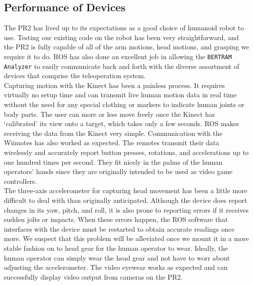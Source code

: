 \documentclass{sig-alternate}
\begin{document}
\subsection{Performance of Devices}
The PR2 has lived up to its expectations as a good choice of humanoid robot to 
use. Testing our existing code on the robot has been very straightforward, and 
the PR2 is fully capable of all of the arm motions, head motions, and grasping
we require it to do. ROS has also done an excellent job in allowing the 
{\tt BERTRAM Analyzer} to easily communicate back and forth with the diverse 
assortment of devices that comprise the teleoperation system.\\
\indent Capturing motion with the Kinect has been a painless process. It requires virtually no setup time and can transmit live human motion data in real time without the need for any special clothing or markers to indicate human joints or body parts. The user can more or less move freely once the Kinect has `calibrated' its view onto a target, which takes only a few seconds. ROS makes receiving the data from the Kinect very simple. Communication with the Wiimotes has also worked as expected. The remotes transmit their data wirelessly and accurately report button presses, rotations, and accelerations up to one hundred times per second. They fit nicely in the palms of the human operators' hands since they are originally intended to be used as video game controllers.\\
\indent The three-axis accelerometer for capturing head movement has been a little more difficult to deal with than originally anticipated. Although the device does report changes in its yaw, pitch, and roll, it is also prone to reporting errors if it receives sudden jolts or impacts. When these errors happen, the ROS software that interfaces with the device must be restarted to obtain accurate readings once more. We suspect that this problem will be alleviated once we mount it in a more stable fashion on to head gear for the human operator to wear. Ideally, the human operator can simply wear the head gear and not have to worr about adjusting the accelerometer. The video eyewear works as expected and can successfully display video output from cameras on the PR2.\\
\end{document}
